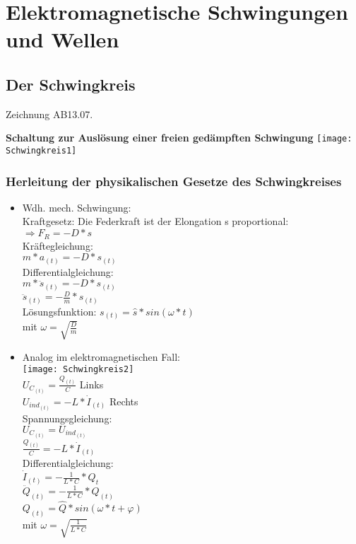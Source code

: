 \section{Elektromagnetische Schwingungen und Wellen}
	
		\subsection{Der Schwingkreis}
		
		Zeichnung AB13.07.
		
		
		\textbf{Schaltung zur Auslösung einer freien gedämpften Schwingung}
		\texttt{[image: Schwingkreis1]}
			
			\subsubsection{Herleitung der physikalischen Gesetze des Schwingkreises}
			
			\begin{itemize}
				\item Wdh. mech. Schwingung: \\
					Kraftgesetz: Die Federkraft ist der Elongation s proportional: \\
					$ \Rightarrow F_R = -D \ast s $ \\
					Kräftegleichung: \\
					$ m \ast a_{(t)} = -D \ast s_{(t)} $ \\
					Differentialgleichung: \\
					$ m \ast \ddot{s}_{(t)} = -D \ast s_{(t)} $ \\
					$ \ddot{s}_{(t)} = -\frac{D}{m} \ast s_{(t)} $ \\
					Lösungsfunktion: $ s_{(t)} = \hat{s} \ast sin(\omega \ast t) $ \\
					\hspace{24mm} mit $ \omega = \sqrt{\frac{D}{m}} $
					
				\item Analog im elektromagnetischen Fall: \\
					\texttt{[image: Schwingkreis2]} \\
					$ U_{C_{(t)}} = \frac{Q_{(t)}}{C}$ \hspace{21mm}Links \\
					$ U_{ind_{(t)}} = -L \ast \dot{I}_{(t)} $ \hspace{10mm}Rechts \\
					Spannungsgleichung: \\
					$ U_{C_{(t)}} = U_{ind_{(t)}} $ \\
					$ \frac{Q_{(t)}}{C} = -L \ast \dot{I}_{(t)} $ \\
					Differentialgleichung: \\
					$ \dot{I}_{(t)} = -\frac{1}{L \ast C} \ast Q_{t} $ \\
					$ \ddot{Q}_{(t)} = -\frac{1}{L \ast C} \ast Q_{(t)} $ \\
					$ Q_{(t)} = \hat{Q} \ast sin(\omega \ast t + \varphi) $ \\
					mit $ \omega = \sqrt{\frac{1}{L \ast C}} $ \\
			\end{itemize}
			
